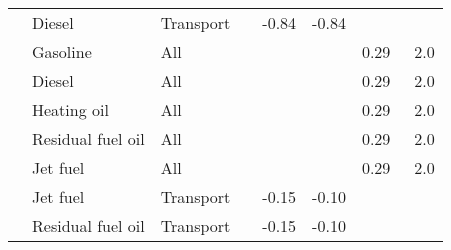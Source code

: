 \begin{ThreePartTable}
\begin{longtable}{ >{\raggedright}p{9em} l l l l l l l }
                                                          & Diesel        & Transport   &      & -0.84\tnote{e}   & -0.84\tnote{e}   &         &        \\ 
    \cite{coyle_estimating_2012}                         & Gasoline      & All         &      &         &         & 0.29\   & 2.0    \\ 
                                                          & Diesel        & All         &      &         &         & 0.29\tnote{e} & 2.0\tnote{e}        \\ 
                                                          & Heating oil   & All         &      &         &         & 0.29\tnote{e} & 2.0\tnote{e}        \\
                                                          & Residual fuel oil& All      &      &         &         & 0.29\tnote{e} & 2.0\tnote{e}        \\
                                                          & Jet fuel      & All         &      &         &         & 0.29\tnote{e} & 2.0\tnote{e}        \\
    \cite{sobieralski_demand_2012}                       & Jet fuel      & Transport   &      & -0.15   & -0.10   &         &        \\ 
                                                          & Residual fuel oil& Transport   &      & -0.15\tnote{f}   & -0.10\tnote{f}   &         &        \\
    

\end{longtable}
\end{ThreePartTable}
